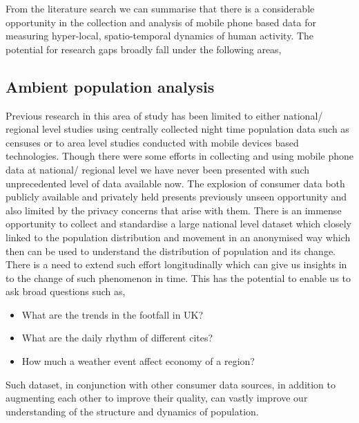 From the literature search we can summarise that there is a considerable opportunity in the collection and analysis of mobile phone based data for measuring hyper-local, spatio-temporal dynamics of human activity.
The potential for research gaps broadly fall under the following areas,

\subsection{Ambient population analysis}


Previous research in this area of study has been limited to either national/ regional level studies using centrally collected night time population data such as censuses or to area level studies conducted with mobile devices based technologies.
Though there were some efforts in collecting and using mobile phone data at national/ regional level we have never been presented with such unprecedented level of data available now.
The explosion of consumer data both publicly available and privately held presents previously unseen opportunity and also limited by the privacy concerns that arise with them.
There is an immense opportunity to collect and standardise a large national level dataset which closely linked to the population distribution and movement in an anonymised way which then can be used to understand the distribution of population and its change.
There is a need to extend such effort  longitudinally which can give us insights in to the change of such phenomenon in time.
This has the potential to enable us to ask broad questions such as,

\begin{itemize}
  \setlength{\itemindent}{2em}
  \itemsep-0.25em
  \item What are the trends in the footfall in UK?
  \item What are the daily rhythm of different cites?
  \item How much a weather event affect economy of a region?
\end{itemize}

Such dataset, in conjunction with other consumer data sources, in addition to augmenting each other to improve their quality, can vastly improve our understanding of the structure and dynamics of population.

